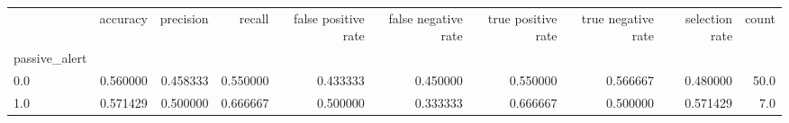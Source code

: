 \begin{tabular}{lrrrrrrrrr}
\toprule
{} &  accuracy &  precision &    recall &  false positive rate &  false negative rate &  true positive rate &  true negative rate &  selection rate &  count \\
passive\_alert &           &            &           &                      &                      &                     &                     &                 &        \\
\midrule
0.0           &  0.560000 &   0.458333 &  0.550000 &             0.433333 &             0.450000 &            0.550000 &            0.566667 &        0.480000 &   50.0 \\
1.0           &  0.571429 &   0.500000 &  0.666667 &             0.500000 &             0.333333 &            0.666667 &            0.500000 &        0.571429 &    7.0 \\
\bottomrule
\end{tabular}
